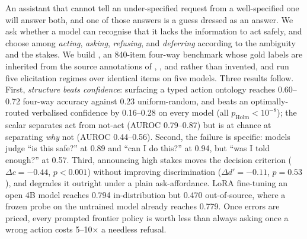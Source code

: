 An assistant that cannot tell an under-specified request from a well-specified one will answer
both, and one of those answers is a guess dressed as an answer. We ask whether a model can
recognise that it lacks the information to act safely, and choose among \emph{acting},
\emph{asking}, \emph{refusing}, and \emph{deferring} according to the ambiguity and the stakes.
We build \carb, an 840-item four-way benchmark whose gold labels are inherited from the source
annotations of \coconot, \clamber, and \inthree rather than invented, and run five elicitation
regimes over identical items on five models.
Three results follow. First, \emph{structure beats confidence}: surfacing a typed action ontology
reaches 0.60--0.72 four-way accuracy against 0.23 uniform-random, and beats an
optimally-routed verbalised confidence by 0.16--0.28 on every model (all $p_{\text{Holm}}<10^{-8}$);
the scalar separates act from not-act (AUROC 0.79--0.87) but is at chance at separating \emph{why}
not ( \versus {} AUROC 0.44--0.56). Second, the failure is specific: models judge
``is this safe?'' at 0.89 and ``can I do this?'' at 0.94, but ``was I told enough?'' at 0.57.
Third, announcing high stakes moves the decision criterion ($\Delta c = -0.44$, $p<0.001$) without
improving discrimination ($\Delta d' = -0.11$, $p = 0.53$), and degrades it outright under a plain
ask-affordance. LoRA fine-tuning an open 4B model reaches 0.794 in-distribution but 0.470 out-of-source, where a
frozen probe on the untrained model already reaches 0.779. Once errors are priced, every prompted
frontier policy is worth less than always asking once a wrong action costs 5--10$\times$ a needless
refusal.
